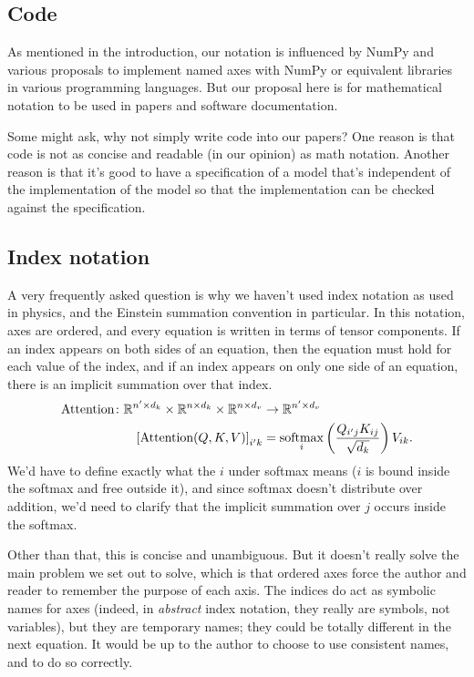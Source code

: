 \subsection{Code}

As mentioned in the introduction, our notation is influenced by NumPy and various proposals to implement named axes with NumPy or equivalent libraries in various programming languages. But our proposal here is for mathematical notation to be used in papers and software documentation.

Some might ask, why not simply write code into our papers? One reason is that code is not as concise and readable (in our opinion) as math notation. Another reason is that it's good to have a specification of a model that's independent of the implementation of the model so that the implementation can be checked against the specification.

\subsection{Index notation}

A very frequently asked question is why we haven't used index notation as used in physics, and the Einstein summation convention in particular. In this notation, axes are ordered, and every equation is written in terms of tensor components.
If an index appears on both sides of an equation, then the equation must hold for each value of the index, and if an index appears on only one side of an equation, there is an implicit summation over that index.
\begin{align*}
  \text{Attention} \colon \mathbb{R}^{n' \times d_k} \times \mathbb{R}^{n \times d_k} \times \mathbb{R}^{n \times d_v} &\rightarrow \mathbb{R}^{n' \times d_v} \\
  \left[\text{Attention}(Q, K, V)\right]_{i'k} &= \operatorname*{softmax}_i \left( \frac{Q_{i'j} K_{ij}}{\sqrt{d_k}} \right) V_{ik}.
\end{align*}
We'd have to define exactly what the $i$ under softmax means ($i$ is bound inside the softmax and free outside it), and since softmax doesn't distribute over addition, we'd need to clarify that the implicit summation over $j$ occurs inside the softmax.

Other than that, this is concise and unambiguous. But it doesn't really solve the main problem we set out to solve, which is that ordered axes force the author and reader to remember the purpose of each axis. The indices do act as symbolic names for axes (indeed, in \emph{abstract} index notation, they really are symbols, not variables), but they are temporary names; they could be totally different in the next equation. It would be up to the author to choose to use consistent names, and to do so correctly.

